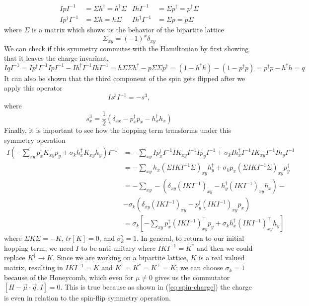 \begin{align*}
  IpI^{-1} &= \Sigma h^\dagger = h^\dagger \Sigma & IhI^{-1} &= \Sigma p^\dagger = p^\dagger \Sigma \\
  Ip^\dagger I^{-1} &= \Sigma h = h \Sigma & Ih^\dagger I^{-1} &= \Sigma p = p \Sigma
\end{align*}
where $\Sigma$ is a matrix which shows us the behavior of the bipartite lattice
\begin{equation}
  \Sigma_{xy} = (-1)^x\delta_{xy}
\end{equation}
We can check if this symmetry commutes with the Hamiltonian by first showing that it leaves the charge invariant,
\begin{equation}
  IqI^{-1} = Ip^\dagger I^{-1}IpI^{-1} - Ih^\dagger I^{-1}IhI^{-1} = h\Sigma\Sigma h^\dagger - p\Sigma\Sigma p^\dagger = (1 - h^\dagger h) - (1 - p^\dagger p) = p^\dagger p - h^\dagger h = q
  \label{eq:spin-charge}
\end{equation}
It can also be shown that the third component of the spin gets flipped after we apply this operator
\begin{equation}
  Is^3I^{-1} = -s^3,
\end{equation}
where
\begin{equation}
  s^3_x = \frac{1}{2}\left(\delta_{xx} - p^\dagger_x p_x - h^\dagger_x h_x\right)
\end{equation}
Finally, it is important to see how the hopping term transforms under this symmetry operation
\begin{align*}
  I\left( -\sum_{xy} p^\dagger_x K_{xy} p_y + \sigma_k h^\dagger_x K_{xy} h_y\right) I^{-1} &= -\sum_{xy} I p^\dagger_x I^{-1}I K_{xy} I^{-1}I p_y I^{-1} + \sigma_k I h^\dagger_x I^{-1}I K_{xy} I^{-1}I h_y I^{-1}
  \\
  &= -\sum_{xy}  h_x (\Sigma I K I^{-1}\Sigma)_{xy} h^\dagger_y + \sigma_k p_x (\Sigma I K I^{-1}\Sigma)_{xy} p^\dagger_y
  \\
  &= -\sum_{xy} -(\delta_{xy} (I K I^{-1})_{xy} - h^\dagger_y (I K I^{-1})_{xy} h_x) -
  \\
  &- \sigma_k (\delta_{xy} (I K I^{-1})_{xy} - p^\dagger_y (I K I^{-1})_{xy} p_x)
  \\
  &= \sigma_k \left[-\sum_{xy} p^\dagger_x (I K I^{-1})^\top_{xy} p_y + \sigma_k h^\dagger_x (I K I^{-1})^\top_{xy} h_y \right]
\end{align*}
where $\Sigma K \Sigma = -K$, $tr[K] = 0$, and $\sigma^2_k = 1$. In general, to return to our initial hopping term, we need $I$ to be anti-unitary where $IKI^{-1} = K^*$ and then we could replace $K^\dagger\rightarrow K$. Since we are working on a bipartite lattice, $K$ is a real valued matrix, resulting in $IKI^{-1} = K$ and $K^\dagger = K^* = K^\top = K$; we can choose $\sigma_k = 1$ because of the Honeycomb, which even for $\mu \neq 0$ gives us the commutator $[H - \vec{\mu}\cdot\vec{q}, I] = 0$. This is true because as shown in (\ref{eq:spin-charge}) the charge is even in relation to the spin-flip symmetry operation.

